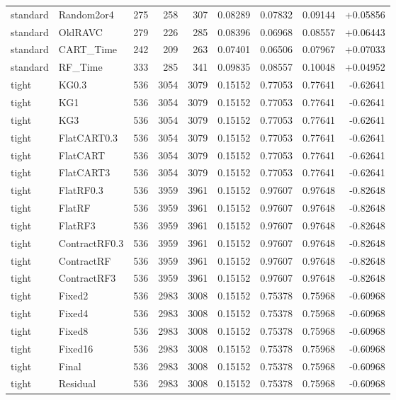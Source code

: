 \begin{longtable}{@{}llrrrrrrr@{}}
standard & Random2or4 & 275 & 258 & 307 & 0.08289 & 0.07832 & 0.09144 & +0.05856\\
standard & OldRAVC & 279 & 226 & 285 & 0.08396 & 0.06968 & 0.08557 & +0.06443\\
standard & CART\_Time & 242 & 209 & 263 & 0.07401 & 0.06506 & 0.07967 & +0.07033\\
standard & RF\_Time & 333 & 285 & 341 & 0.09835 & 0.08557 & 0.10048 & +0.04952\\
tight & KG0.3 & 536 & 3054 & 3079 & 0.15152 & 0.77053 & 0.77641 & -0.62641\\
tight & KG1 & 536 & 3054 & 3079 & 0.15152 & 0.77053 & 0.77641 & -0.62641\\
tight & KG3 & 536 & 3054 & 3079 & 0.15152 & 0.77053 & 0.77641 & -0.62641\\
tight & FlatCART0.3 & 536 & 3054 & 3079 & 0.15152 & 0.77053 & 0.77641 & -0.62641\\
tight & FlatCART & 536 & 3054 & 3079 & 0.15152 & 0.77053 & 0.77641 & -0.62641\\
tight & FlatCART3 & 536 & 3054 & 3079 & 0.15152 & 0.77053 & 0.77641 & -0.62641\\
tight & FlatRF0.3 & 536 & 3959 & 3961 & 0.15152 & 0.97607 & 0.97648 & -0.82648\\
tight & FlatRF & 536 & 3959 & 3961 & 0.15152 & 0.97607 & 0.97648 & -0.82648\\
tight & FlatRF3 & 536 & 3959 & 3961 & 0.15152 & 0.97607 & 0.97648 & -0.82648\\
tight & ContractRF0.3 & 536 & 3959 & 3961 & 0.15152 & 0.97607 & 0.97648 & -0.82648\\
tight & ContractRF & 536 & 3959 & 3961 & 0.15152 & 0.97607 & 0.97648 & -0.82648\\
tight & ContractRF3 & 536 & 3959 & 3961 & 0.15152 & 0.97607 & 0.97648 & -0.82648\\
tight & Fixed2 & 536 & 2983 & 3008 & 0.15152 & 0.75378 & 0.75968 & -0.60968\\
tight & Fixed4 & 536 & 2983 & 3008 & 0.15152 & 0.75378 & 0.75968 & -0.60968\\
tight & Fixed8 & 536 & 2983 & 3008 & 0.15152 & 0.75378 & 0.75968 & -0.60968\\
tight & Fixed16 & 536 & 2983 & 3008 & 0.15152 & 0.75378 & 0.75968 & -0.60968\\
tight & Final & 536 & 2983 & 3008 & 0.15152 & 0.75378 & 0.75968 & -0.60968\\
tight & Residual & 536 & 2983 & 3008 & 0.15152 & 0.75378 & 0.75968 & -0.60968\\

\end{longtable}

